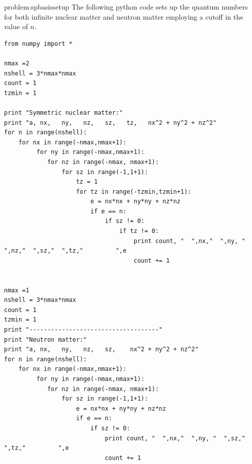 \begin{prob}
  \begin{sol}{problem:spbasissetup}
  The following python code sets up the quantum numbers for both
  infinite nuclear matter and neutron matter employing a cutoff in
  the value of $n$.
  \begin{lstlisting}
from numpy import *

nmax =2
nshell = 3*nmax*nmax
count = 1
tzmin = 1

print "Symmetric nuclear matter:"  
print "a, nx,   ny,   nz,   sz,   tz,   nx^2 + ny^2 + nz^2"
for n in range(nshell): 
    for nx in range(-nmax,nmax+1):
         for ny in range(-nmax,nmax+1):
            for nz in range(-nmax, nmax+1):  
                for sz in range(-1,1+1):
                    tz = 1
                    for tz in range(-tzmin,tzmin+1):
                        e = nx*nx + ny*ny + nz*nz
                        if e == n:
                            if sz != 0: 
                                if tz != 0: 
                                    print count, "  ",nx,"  ",ny, "  ",nz,"  ",sz,"  ",tz,"         ",e
                                    count += 1
                                    
                                    
nmax =1
nshell = 3*nmax*nmax
count = 1
tzmin = 1
print "------------------------------------"
print "Neutron matter:"                                    
print "a, nx,   ny,   nz,   sz,    nx^2 + ny^2 + nz^2"
for n in range(nshell): 
    for nx in range(-nmax,nmax+1):
         for ny in range(-nmax,nmax+1):
            for nz in range(-nmax, nmax+1):  
                for sz in range(-1,1+1):
                    e = nx*nx + ny*ny + nz*nz
                    if e == n:
                        if sz != 0: 
                            print count, "  ",nx,"  ",ny, "  ",sz,"  ",tz,"         ",e
                            count += 1     
  \end{lstlisting}                               
  \end{sol}







\end{prob}
